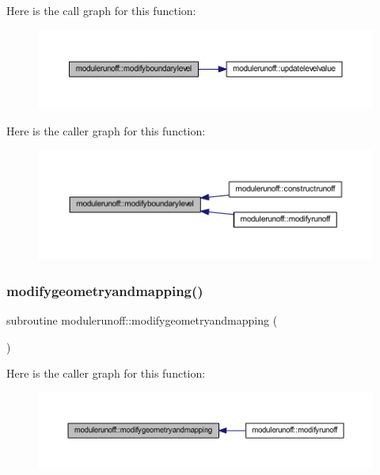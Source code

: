 Here is the call graph for this function\+:
\nopagebreak
\begin{figure}[H]
\begin{center}
\leavevmode
\includegraphics[width=350pt]{namespacemodulerunoff_aac03c1526e1f45dcfe31d200ac141d7e_cgraph}
\end{center}
\end{figure}
Here is the caller graph for this function\+:
\nopagebreak
\begin{figure}[H]
\begin{center}
\leavevmode
\includegraphics[width=350pt]{namespacemodulerunoff_aac03c1526e1f45dcfe31d200ac141d7e_icgraph}
\end{center}
\end{figure}
\mbox{\label{namespacemodulerunoff_a5ae3563ef43601cbe338d999deca7e2b}} 
\subsubsection{\texorpdfstring{modifygeometryandmapping()}{modifygeometryandmapping()}}
{\footnotesize\ttfamily subroutine modulerunoff\+::modifygeometryandmapping (\begin{DoxyParamCaption}{ }\end{DoxyParamCaption})\hspace{0.3cm}{\ttfamily [private]}}

Here is the caller graph for this function\+:
\nopagebreak
\begin{figure}[H]
\begin{center}
\leavevmode
\includegraphics[width=350pt]{namespacemodulerunoff_a5ae3563ef43601cbe338d999deca7e2b_icgraph}
\end{center}
\end{figure}
\mbox{\label{namespacemodulerunoff_a43ce9e041625ab643d74cc279ddf43db}} 
